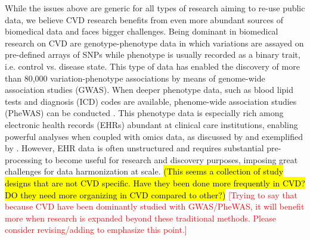 \documentclass[letter]{bioinfo}
\newcommand{\comment}[1]{\textcolor{red}{[#1]}}
\begin{document}
    While the issues above are generic for all types of research aiming to re-use public data, we believe CVD research benefits from even more abundant sources of biomedical data and faces bigger challenges. Being dominant in biomedical research on CVD are genotype-phenotype data in which variations are assayed on pre-defined arrays of SNPs while phenotype is usually recorded as a binary trait, i.e. control vs. disease state. This type of data has enabled the discovery of more than 80,000 variation-phenotype associations by means of genome-wide association studies (GWAS). When deeper phenotype data, such as blood lipid tests and diagnosis (ICD) codes are available, phenome-wide association studies (PheWAS) can be conducted \citep{Denny:2013:Systematic}. This phenotype data is especially rich among electronic health records (EHRs) abundant at clinical care institutions, enabling powerful analyses when coupled with omics data, as discussed by \cite{Denaxas:2015:Big, Wu:2017:Omic} and exemplified by \cite{Dewey:2016:Distribution,Li:2018:Decoding}. However, EHR data is often unstructured and requires substantial pre-processing to become useful for research and discovery purposes, imposing great challenges for data harmonization at scale. \hl{(This seems a collection of study designs that are not CVD specific.  Have they been done more frequently in CVD?  DO they need more organizing in CVD compared to other?)} \comment{Trying to say that because CVD have been dominantly studied with GWAS/PheWAS, it will benefit more when research is expanded beyond these traditional methods.  Please consider revising/adding to emphasize this point.}
    
\end{document}
